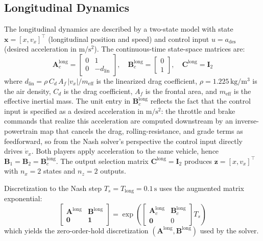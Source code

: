 \documentclass[12pt,a4paper,oneside]{report}
\begin{document}
\subsection{Longitudinal Dynamics}
\label{sec:longitudinal_dynamics}

The longitudinal dynamics are described by a two-state model with state $\mathbf{x} = [x, v_x]^{\top}$ (longitudinal position and speed) and control input $u = a_{\text{des}}$ (desired acceleration in $\mathrm{m/s^2}$). The continuous-time state-space matrices are:
\begin{equation}
\mathbf{A}_c^{\text{long}} = \begin{bmatrix} 0 & 1 \\ 0 & -d_{\text{lin}} \end{bmatrix}, \quad
\mathbf{B}_c^{\text{long}} = \begin{bmatrix} 0 \\ 1 \end{bmatrix}, \quad
\mathbf{C}^{\text{long}} = \mathbf{I}_2
\label{eq:long_ss}
\end{equation}
where $d_{\text{lin}} = \rho \, C_d \, A_f \, |v_x| / m_{\text{eff}}$ is the linearized drag coefficient, $\rho = 1.225\,\mathrm{kg/m^3}$ is the air density, $C_d$ is the drag coefficient, $A_f$ is the frontal area, and $m_{\text{eff}}$ is the effective inertial mass. The unit entry in $\mathbf{B}_c^{\text{long}}$ reflects the fact that the control input is specified as a desired acceleration in $\mathrm{m/s^2}$: the throttle and brake commands that realize this acceleration are computed downstream by an inverse-powertrain map that cancels the drag, rolling-resistance, and grade terms as feedforward, so from the Nash solver's perspective the control input directly drives $\dot{v}_x$. Both players apply acceleration to the same vehicle, hence $\mathbf{B}_1 = \mathbf{B}_2 = \mathbf{B}_c^{\text{long}}$. The output selection matrix $\mathbf{C}^{\text{long}} = \mathbf{I}_2$ produces $\mathbf{z} = [x, v_x]^{\top}$ with $n_x = 2$ states and $n_z = 2$ outputs.

Discretization to the Nash step $T_s = T_{\text{long}} = 0.1\,\mathrm{s}$ uses the augmented matrix exponential:
\begin{equation}
\begin{bmatrix} \mathbf{A}^{\text{long}} & \mathbf{B}^{\text{long}} \\ \mathbf{0} & \mathbf{1} \end{bmatrix}
= \exp\!\left( \begin{bmatrix} \mathbf{A}_c^{\text{long}} & \mathbf{B}_c^{\text{long}} \\ \mathbf{0} & 0 \end{bmatrix} T_s \right)
\label{eq:long_zoh}
\end{equation}
which yields the zero-order-hold discretization $(\mathbf{A}^{\text{long}}, \mathbf{B}^{\text{long}})$ used by the solver.
\end{document}
